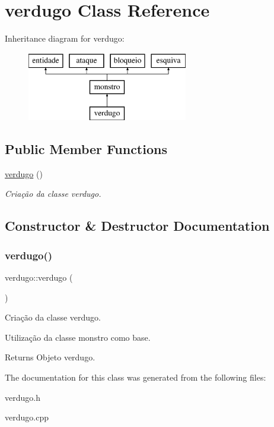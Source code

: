 \hypertarget{classverdugo}{}\section{verdugo Class Reference}
\label{classverdugo}
Inheritance diagram for verdugo\+:\begin{figure}[H]
\begin{center}
\leavevmode
\includegraphics[height=3.000000cm]{classverdugo}
\end{center}
\end{figure}
\subsection*{Public Member Functions}
\begin{DoxyCompactItemize}
\item 
\mbox{\hyperlink{classverdugo_aa7b5dc56ccf1f758fb7cec5b6b7306ab}{verdugo}} ()
\begin{DoxyCompactList}\small\item\em Criação da classe verdugo. \end{DoxyCompactList}\end{DoxyCompactItemize}


\subsection{Constructor \& Destructor Documentation}
\mbox{\label{classverdugo_aa7b5dc56ccf1f758fb7cec5b6b7306ab}} 
\subsubsection{\texorpdfstring{verdugo()}{verdugo()}}
{\footnotesize\ttfamily verdugo\+::verdugo (\begin{DoxyParamCaption}{ }\end{DoxyParamCaption})}



Criação da classe verdugo. 

Utilização da classe monstro como base. \begin{DoxyReturn}{Returns}
Objeto verdugo. 
\end{DoxyReturn}


The documentation for this class was generated from the following files\+:\begin{DoxyCompactItemize}
\item 
verdugo.\+h\item 
verdugo.\+cpp\end{DoxyCompactItemize}
